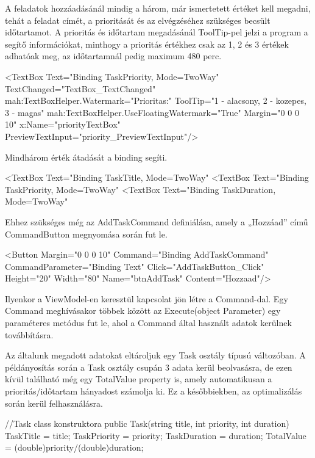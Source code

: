 

A feladatok hozzáadásánál mindig a három, már ismertetett értéket kell megadni, tehát a feladat címét, a prioritását és az elvégzéséhez szükséges becsült időtartamot. A prioritás és időtartam megadásánál ToolTip-pel jelzi a program a segítő információkat, minthogy a prioritás értékhez csak az 1, 2 és 3 értékek adhatóak meg, az időtartamnál pedig maximum 480 perc.

\begin{java}
<TextBox Text="{Binding TaskPriority, Mode=TwoWay}"
TextChanged="TextBox_TextChanged"
mah:TextBoxHelper.Watermark="Prioritas:"
ToolTip="1 - alacsony, 2 - kozepes, 3 - magas"
mah:TextBoxHelper.UseFloatingWatermark="True"
Margin="0 0 0 10"
x:Name="priorityTextBox"
PreviewTextInput="priority_PreviewTextInput"/>
\end{java}

Mindhárom érték átadását a binding segíti.

\begin{java}
<TextBox Text="{Binding TaskTitle, Mode=TwoWay}"
<TextBox Text="{Binding TaskPriority, Mode=TwoWay}"
<TextBox Text="{Binding TaskDuration, Mode=TwoWay}"
\end{java}

Ehhez szükséges még az AddTaskCommand definiálása, amely a „Hozzáad” című CommandButton megnyomása során fut le.

\begin{java}
<Button 
Margin="0 0 0 10"
Command="{Binding AddTaskCommand}"
CommandParameter="{Binding Text}"
Click="AddTaskButton_Click"
Height="20" Width="80"
Name="btnAddTask"
Content="Hozzaad"/>	
\end{java}

Ilyenkor a ViewModel-en keresztül kapcsolat jön létre a Command-dal. Egy Command meghívásakor többek között az Execute(object Parameter) egy paraméteres metódus fut le, ahol a Command által használt adatok kerülnek továbbításra.

Az általunk megadott adatokat eltároljuk egy Task osztály típusú változóban. A példányosítás során a Task osztály csupán 3 adata kerül beolvasásra, de ezen kívül található még egy TotalValue property is, amely automatikusan a prioritás/időtartam hányadost számolja ki. Ez a későbbiekben, az optimalizálás során kerül felhasználásra.

\begin{java}
//Task class konstruktora
public Task(string title, int priority, int duration)
{
	TaskTitle = title;
	TaskPriority = priority;
	TaskDuration = duration;
	TotalValue = (double)priority/(double)duration;
}	
\end{java}

